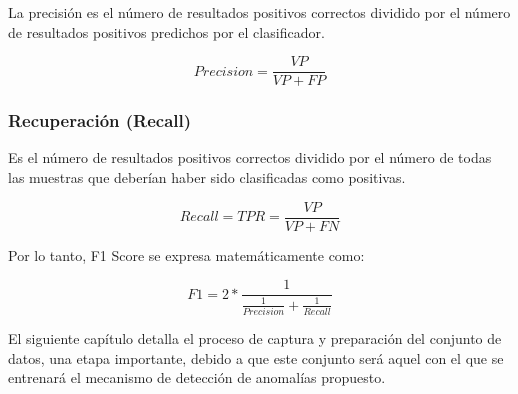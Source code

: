 La precisi\'{o}n es el n\'{u}mero de resultados positivos correctos dividido por el n\'{u}mero de resultados positivos predichos por el clasificador.

\begin{equation}
Precision = \frac{VP}{VP+FP}
\end{equation}

\subsubsection{Recuperaci\'{o}n (Recall)}

Es el n\'{u}mero de resultados positivos correctos dividido por el n\'{u}mero de todas las muestras que deber\'{i}an haber sido clasificadas como positivas.

\begin{equation}
Recall = TPR = \frac{VP}{VP+FN}
\end{equation}

Por lo tanto, F1 Score se expresa matem\'{a}ticamente como:

\begin{equation}
F1 = 2*\frac{1}{\frac{1}{Precision}+\frac{1}{Recall}}
\end{equation}




El siguiente cap\'{i}tulo detalla el proceso de captura y preparaci\'{o}n del conjunto de datos, una etapa importante, debido a que este conjunto ser\'{a} aquel con el que se entrenar\'{a} el mecanismo de detecci\'{o}n de anomal\'{i}as propuesto.
